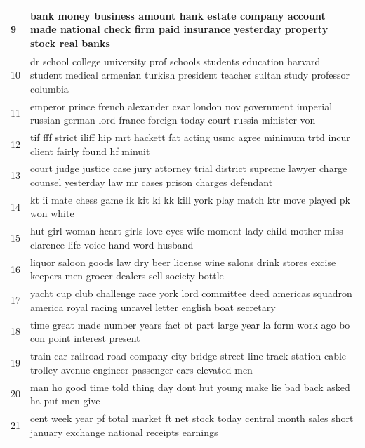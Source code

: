 \documentclass[letterpaper,11pt]{report}
\begin{document}
\begin{longtable}[c]{| p{1cm} | p{16cm} |}
9  & bank money business amount hank estate company account made national check firm paid insurance yesterday property stock real banks                               \\ \hline
10 & dr school college university prof schools students education harvard student medical armenian turkish president teacher sultan study professor columbia          \\ \hline
11 & emperor prince french alexander czar london nov government imperial russian german lord france foreign today court russia minister von                           \\ \hline
12 & tif fff strict iliff hip mrt hackett fat acting usmc agree minimum trtd incur client fairly found hf minuit                                                      \\ \hline
13 & court judge justice case jury attorney trial district supreme lawyer charge counsel yesterday law mr cases prison charges defendant                              \\ \hline
14 & kt ii mate chess game ik kit ki kk kill york play match ktr move played pk won white                                                                             \\ \hline
15 & hut girl woman heart girls love eyes wife moment lady child mother miss clarence life voice hand word husband                                                    \\ \hline
16 & liquor saloon goods law dry beer license wine salons drink stores excise keepers men grocer dealers sell society bottle                                          \\ \hline
17 & yacht cup club challenge race york lord committee deed americas squadron america royal racing unravel letter english boat secretary                              \\ \hline
18 & time great made number years fact ot part large year la form work ago bo con point interest present                                                              \\ \hline
19 & train car railroad road company city bridge street line track station cable trolley avenue engineer passenger cars elevated men                                  \\ \hline
20 & man ho good time told thing day dont hut young make lie bad back asked ha put men give                                                                           \\ \hline
21 & cent week year pf total market ft net stock today central month sales short january exchange national receipts earnings                                          \\ \hline

\end{longtable}
\end{document}

